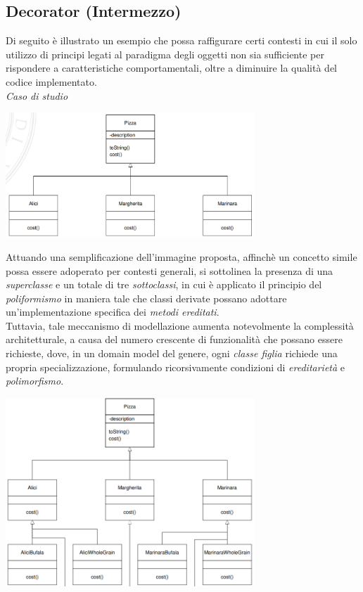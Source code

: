 \documentclass{article}
\begin{document}
\subsection*{Decorator (Intermezzo)}
\large
Di seguito è illustrato un esempio che possa raffigurare certi contesti in cui il solo utilizzo di principi legati al paradigma degli oggetti non sia sufficiente per rispondere a caratteristiche comportamentali, oltre a diminuire la qualità del codice implementato.\vspace*{14pt}\\
\textit{Caso di studio}\\
\begin{center}
    \includegraphics[width=0.7\textwidth]{foto 2.png}
\end{center}
Attuando una semplificazione dell'immagine proposta, affinchè un concetto simile possa essere adoperato per contesti generali, si sottolinea la presenza di una \textit{superclasse} e un totale di tre \textit{sottoclassi}, in cui è applicato il principio del \textit{poliformismo} in maniera tale che classi derivate possano adottare un'implementazione specifica dei \textit{metodi ereditati}.\\
Tuttavia, tale meccanismo di modellazione aumenta notevolmente la complessità architetturale, a causa del numero crescente di funzionalità che possano essere richieste, dove, in un domain model del genere, ogni \textit{classe figlia} richiede una propria specializzazione, formulando ricorsivamente condizioni di \textit{ereditarietà} e \textit{polimorfismo}.\vspace*{3pt}  
\begin{center}
    \includegraphics[width=0.7\textwidth]{foto 3.png}
\end{center}
\end{document}
